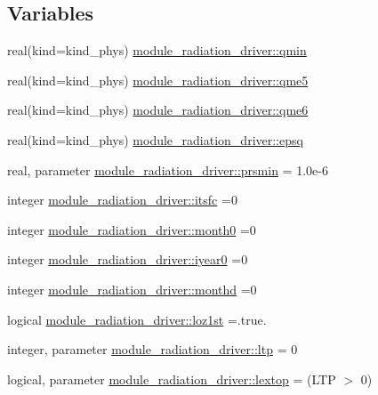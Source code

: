 \subsection*{Variables}
\begin{DoxyCompactItemize}
\item 
real(kind=kind\+\_\+phys) \hyperlink{group__module__radiation__driver_gafdc2a7e1dbfb075ac33a2388564d9428}{module\+\_\+radiation\+\_\+driver\+::qmin}
\item 
real(kind=kind\+\_\+phys) \hyperlink{group__module__radiation__driver_gab671cb80142c71dab5f41f01ccdcc088}{module\+\_\+radiation\+\_\+driver\+::qme5}
\item 
real(kind=kind\+\_\+phys) \hyperlink{group__module__radiation__driver_ga4916e37c472b2f824b6f566ff67200cd}{module\+\_\+radiation\+\_\+driver\+::qme6}
\item 
real(kind=kind\+\_\+phys) \hyperlink{group__module__radiation__driver_ga0b0bf0fa8723b80d0891ec3327d187d7}{module\+\_\+radiation\+\_\+driver\+::epsq}
\item 
real, parameter \hyperlink{group__module__radiation__driver_ga3fc43ca0d2c5f69a380ddb4f0926ecc7}{module\+\_\+radiation\+\_\+driver\+::prsmin} = 1.\+0e-\/6
\item 
integer \hyperlink{group__module__radiation__driver_ga9ee6a89464bf206cc07ea30d7eeaaeb8}{module\+\_\+radiation\+\_\+driver\+::itsfc} =0
\item 
integer \hyperlink{group__module__radiation__driver_ga6eb268f296c77047f389ed6fac5f95be}{module\+\_\+radiation\+\_\+driver\+::month0} =0
\item 
integer \hyperlink{group__module__radiation__driver_ga4d755de48d0aa83f337a2a907ac7d8a2}{module\+\_\+radiation\+\_\+driver\+::iyear0} =0
\item 
integer \hyperlink{group__module__radiation__driver_gac4baf8ff048aaa5b85d03cc42c579c7b}{module\+\_\+radiation\+\_\+driver\+::monthd} =0
\item 
logical \hyperlink{group__module__radiation__driver_gaf6e0e1ef2ebb78f57c897ebaf633edd2}{module\+\_\+radiation\+\_\+driver\+::loz1st} =.true.
\item 
integer, parameter \hyperlink{group__module__radiation__driver_gaab2535e9906afd709124056f4ca1e470}{module\+\_\+radiation\+\_\+driver\+::ltp} = 0
\item 
logical, parameter \hyperlink{group__module__radiation__driver_gad27b36d0186c8147fe839eb5c268d157}{module\+\_\+radiation\+\_\+driver\+::lextop} = (L\+TP $>$ 0)
\end{DoxyCompactItemize}
